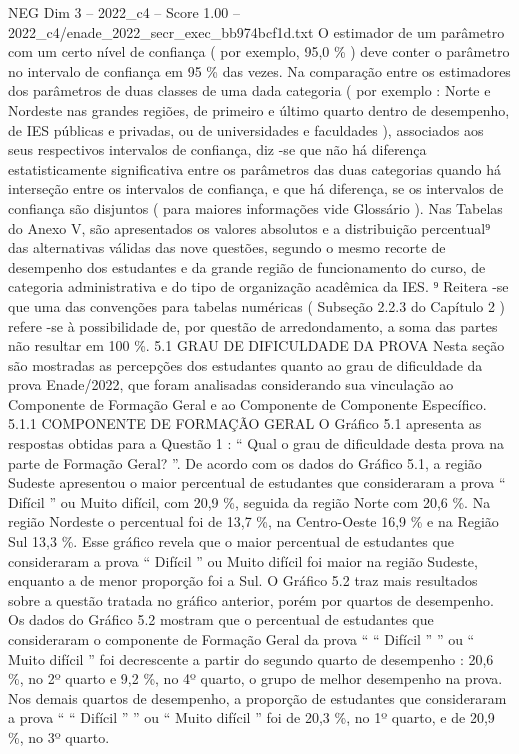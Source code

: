 \begin{textsample}{NEG Dim 3 – 2022\_c4 – Score 1.00 – 2022\_c4/enade\_2022\_secr\_exec\_bb974bcf1d.txt}
O estimador de um parâmetro com um certo nível de confiança ( por exemplo, 95,0 \% ) deve conter o parâmetro no intervalo de confiança em 95 \% das vezes.
Na comparação entre os estimadores dos parâmetros de duas classes de uma dada categoria ( por exemplo : Norte e Nordeste nas grandes regiões, de primeiro e último quarto dentro de desempenho, de IES públicas e privadas, ou de universidades e faculdades ), associados aos seus respectivos intervalos de confiança, diz -se que não há diferença estatisticamente significativa entre os parâmetros das duas categorias quando há interseção entre os intervalos de confiança, e que há diferença, se os intervalos de confiança são disjuntos ( para maiores informações vide Glossário ).
Nas Tabelas do Anexo V, são apresentados os valores absolutos e a distribuição percentual⁹ das alternativas válidas das nove questões, segundo o mesmo recorte de desempenho dos estudantes e da grande região de funcionamento do curso, de categoria administrativa e do tipo de organização acadêmica da IES. ⁹ Reitera -se que uma das convenções para tabelas numéricas ( Subseção 2.2.3 do Capítulo 2 ) refere -se à possibilidade de, por questão de arredondamento, a soma das partes não resultar em 100 \%. 5.1 GRAU DE DIFICULDADE DA PROVA Nesta seção são mostradas as percepções dos estudantes quanto ao grau de dificuldade da prova Enade/2022, que foram analisadas considerando sua vinculação ao Componente de Formação Geral e ao Componente de Componente Específico. 5.1.1 COMPONENTE DE FORMAÇÃO GERAL O Gráfico 5.1 apresenta as respostas obtidas para a Questão 1 : “ Qual o grau de dificuldade desta prova na parte de Formação Geral? ”.
De acordo com os dados do Gráfico 5.1, a região Sudeste apresentou o maior percentual de estudantes que consideraram a prova “ Difícil ” ou Muito difícil, com 20,9 \%, seguida da região Norte com 20,6 \%.
Na região Nordeste o percentual foi de 13,7 \%, na Centro-Oeste 16,9 \% e na Região Sul 13,3 \%.
Esse gráfico revela que o maior percentual de estudantes que consideraram a prova “ Difícil ” ou Muito difícil foi maior na região Sudeste, enquanto a de menor proporção foi a Sul.
O Gráfico 5.2 traz mais resultados sobre a questão tratada no gráfico anterior, porém por quartos de desempenho.
Os dados do Gráfico 5.2 mostram que o percentual de estudantes que consideraram o componente de Formação Geral da prova “ “ Difícil ” ” ou “ Muito difícil ” foi decrescente a partir do segundo quarto de desempenho : 20,6 \%, no 2º quarto e 9,2 \%, no 4º quarto, o grupo de melhor desempenho na prova.
Nos demais quartos de desempenho, a proporção de estudantes que consideraram a prova “ “ Difícil ” ” ou “ Muito difícil ” foi de 20,3 \%, no 1º quarto, e de 20,9 \%, no 3º quarto.

\end{textsample}
